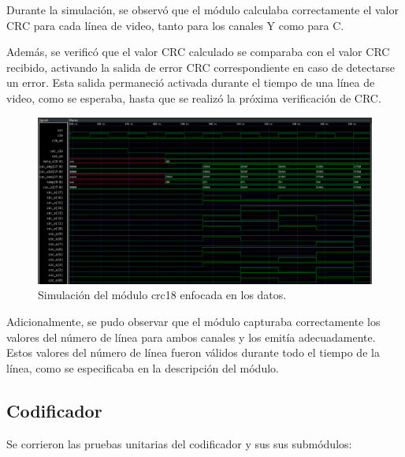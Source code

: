   Durante la simulación, se observó que el módulo calculaba correctamente el
  valor CRC para cada línea de video, tanto para los canales Y como para C.
  
  Además, se verificó que el valor CRC calculado se comparaba con el valor CRC
  recibido, activando la salida de error CRC correspondiente en caso de detectarse
  un error. Esta salida permaneció activada durante el tiempo de una línea de
  video, como se esperaba, hasta que se realizó la próxima verificación de CRC\@.

  \begin{figure}[htbp]
    \centering
    \includegraphics[width=1\textwidth]{./Figures/crc18_zoom.png}
    \caption{Simulación del módulo crc18 enfocada en los datos.}\label{fig:crc18-z}
  \end{figure}

  Adicionalmente, se pudo observar que el módulo capturaba correctamente los
  valores del número de línea para ambos canales y los emitía adecuadamente.
  Estos valores del número de línea fueron válidos durante todo el tiempo de la
  línea, como se especificaba en la descripción del módulo.

\subsection{Codificador}

  Se corrieron las pruebas unitarias del codificador y sus sus submódulos:

